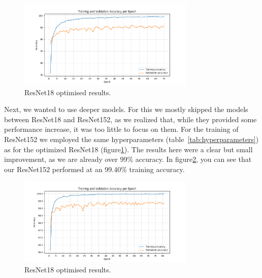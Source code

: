 \begin{figure}[ht]
    \centering
    \includegraphics[width=0.75\textwidth]{figures/model_18_v5_accuracy.png}
    \caption{ResNet18 optimised results.}\label{fig:resNet18opt}
\end{figure}

\label{ResNet152}
Next, we wanted to use deeper models. For this we mostly skipped the models between ResNet18 and ResNet152, as we realized that, while they provided some performance increase, it was too little to focus on them. For the training of ResNet152 we employed the same hyperparameters (table~\ref{tab:hyperparameters}) as for the optimized ResNet18 (figure\ref{fig:resNet18opt}). The results here were a clear but small improvement, as we are already over 99\% accuracy. In figure\ref{fig:resNet152opt}, you can see that our ResNet152 performed at an 99.40\% training accuracy. 

\begin{figure}[ht]
    \centering
    \includegraphics[width=0.75\textwidth]{figures/model_152_v4_accuracy.png}
    \caption{ResNet18 optimised results.}\label{fig:resNet152opt}
\end{figure}

